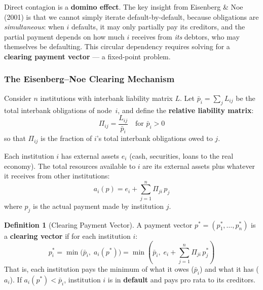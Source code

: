 \documentclass[11pt, a4paper]{article}
\theoremstyle{definition}
\newtheorem{definition}{Definition}[section]
\theoremstyle{plain}
\theoremstyle{remark}
\begin{document}
\begin{keyidea}
Direct contagion is a \textbf{domino effect}.
The key insight from Eisenberg \& Noe (2001) is that we cannot simply iterate
default-by-default, because obligations are \emph{simultaneous}: when $i$ defaults,
it may only partially pay its creditors, and the partial payment depends on how
much $i$ receives from \emph{its} debtors, who may themselves be defaulting.
This circular dependency requires solving for a \textbf{clearing payment vector}
--- a fixed-point problem.
\end{keyidea}

\subsubsection{The Eisenberg--Noe Clearing Mechanism}

Consider $n$ institutions with interbank liability matrix $L$.
Let $\bar{p}_i = \sum_{j} L_{ij}$ be the total interbank obligations of node~$i$,
and define the \textbf{relative liability matrix}:
\begin{equation}\label{eq:relative-liability}
    \Pi_{ij} = \frac{L_{ij}}{\bar{p}_i} \quad \text{for } \bar{p}_i > 0
\end{equation}
so that $\Pi_{ij}$ is the fraction of $i$'s total interbank obligations owed to $j$.

Each institution $i$ has external assets $e_i$ (cash, securities, loans to the
real economy).
The total resources available to $i$ are its external assets plus whatever it
receives from other institutions:
\begin{equation}\label{eq:total-resources}
    a_i(p) = e_i + \sum_{j=1}^{n} \Pi_{ji}\, p_j
\end{equation}
where $p_j$ is the actual payment made by institution $j$.

\begin{definition}[Clearing Payment Vector]\label{def:clearing}
A payment vector $p^* = (p_1^*, \ldots, p_n^*)$ is a \textbf{clearing vector} if
for each institution $i$:
\begin{equation}\label{eq:clearing}
    p_i^* = \min\!\bigl(\bar{p}_i,\; a_i(p^*)\bigr)
    = \min\!\left(\bar{p}_i,\; e_i + \sum_{j=1}^{n} \Pi_{ji}\, p_j^*\right)
\end{equation}
That is, each institution pays the minimum of what it owes ($\bar{p}_i$) and what
it has ($a_i$).
If $a_i(p^*) < \bar{p}_i$, institution $i$ is in \textbf{default} and pays pro
rata to its creditors.
\end{definition}
\end{document}
